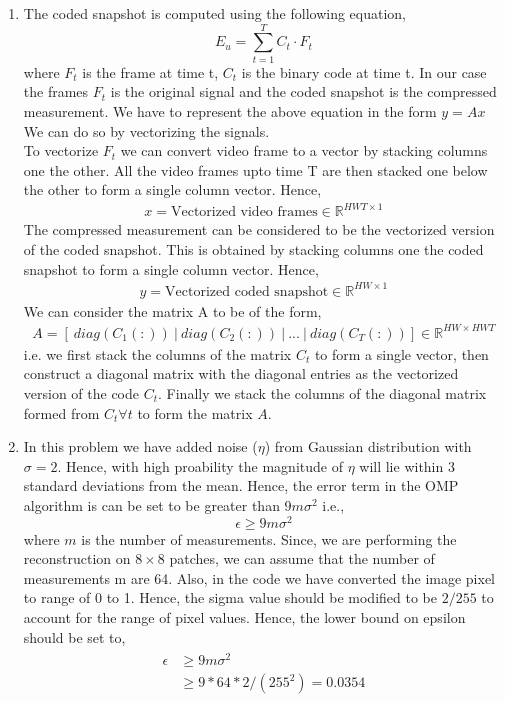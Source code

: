 \documentclass[12pt]{article}
\begin{document}
\begin{itemize}
\begin{enumerate}
    \item The coded snapshot is computed using the following equation,
    \begin{equation}
        E_u = \sum_{t=1}^T C_t \cdot F_t
    \end{equation}
    where $F_t$ is the frame at time t, $C_t$ is the binary code at time t. In our case the frames $F_t$ is the original signal and the coded snapshot is the compressed measurement. We have to represent the above equation in the form $y = A x$
    We can do so by vectorizing the signals. \\
    To vectorize $F_t$ we can convert video frame to a vector by stacking columns one the other. All the video frames upto time T are then stacked one below the other to form a single column vector. Hence,
    \begin{gather*}
        x = \text{Vectorized video frames} \in \mathbb{R}^{HWT \times 1}
    \end{gather*} 
    The compressed measurement can be considered to be the vectorized version of the coded snapshot. This is obtained by stacking columns one the coded snapshot to form a single column vector. Hence,
    \begin{gather*}
        y = \text{Vectorized coded snapshot} \in \mathbb{R}^{HW \times 1}
    \end{gather*}
    We can consider the matrix A to be of the form,
    \begin{gather*}
        A = [ \ diag(C_1 (:)) \ | \ diag(C_2 (:)) \ | \ ... \ | \ diag(C_T (:)) ] \in \mathbb{R}^{HW \times HWT}
    \end{gather*}
    i.e. we first stack the columns of the matrix $C_t$ to form a single vector, then construct a diagonal matrix with the diagonal entries as the vectorized version of the code $C_t$. Finally we stack the columns of the diagonal matrix formed from $ C_{t} \forall t$ to form the matrix $A$.

    \item In this problem we have added noise ($\eta$) from Gaussian distribution with $\sigma = 2$. Hence, with high proability the magnitude of $\eta$ will lie within 3 standard deviations from the mean. Hence, the error term in the OMP algorithm is can be set to be greater than $9m\sigma^2$ i.e.,
    $$ \epsilon \geq 9m\sigma^2 $$
    where $m$ is the number of measurements. Since, we are performing the reconstruction on $8 \times 8$ patches, we can assume that the number of measurements m are 64. Also, in the code we have converted the image pixel to range of 0 to 1. Hence, the sigma value should be modified to be $2/255$ to account for the range of pixel values. Hence, the lower bound on epsilon should be set to,
    \begin{gather*}
        \begin{aligned}
            \epsilon &\geq 9m\sigma^2 \\
            &\geq 9*64*2/(255^2) = 0.0354
        \end{aligned}
    \end{gather*}


\end{enumerate}
\end{itemize}
\end{document}
